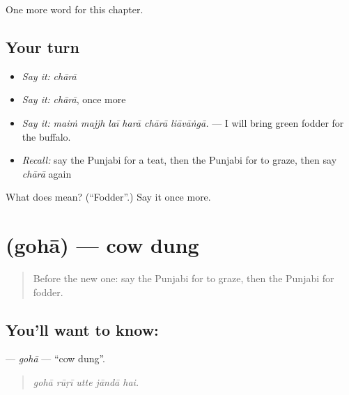 \begin{grammarlens}[title={What you've built}]
One more word for this chapter.
\end{grammarlens}

\subsection*{Your turn}
\begin{itemize}
\raggedright
  \item \emph{Say it:} \emph{chārā}
  \item \emph{Say it:} \emph{chārā}, once more
  \item \emph{Say it:} \emph{maiṁ majjh laī harā chārā liāvāṅgā.} — I will bring green fodder for the buffalo.
  \item \emph{Recall:} say the Punjabi for a teat, then the Punjabi for to graze, then say \emph{chārā} again
\end{itemize}

\begin{tcolorbox}[breakable,colback=teal!4,colframe=teal!35!black,title={Before you move on}]
What does  mean? (\textquotedblleft{}Fodder\textquotedblright{}.) Say it once more.
\end{tcolorbox}
\section[\texorpdfstring{\pa{ਗੋਹਾ} (gohā)}{ਗੋਹਾ (gohā)}]{ (gohā) — cow dung}

\label{lesson:PA-C308-goha}



\begin{quote}
Before the new one: say the Punjabi for to graze, then the Punjabi for fodder.
\end{quote}

\subsection*{You'll want to know: }
\textbf{} — \emph{gohā} — \textquotedblleft{}cow dung\textquotedblright{}.

\begin{quote}
    
\end{quote}

\begin{quote}
\emph{gohā rūṛī utte jāndā hai.}
\end{quote}

